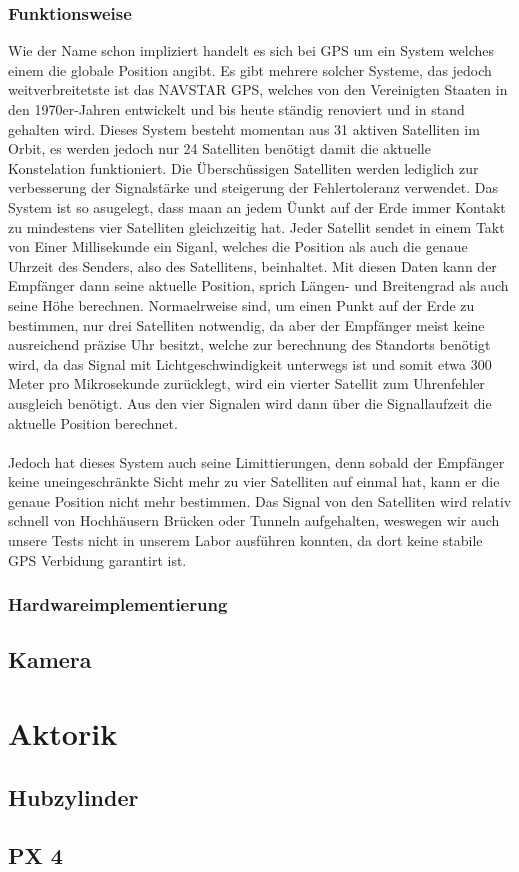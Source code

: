 \subsubsection{Funktionsweise}
Wie der Name schon impliziert handelt es sich bei GPS um ein System welches einem die globale Position angibt. Es gibt mehrere solcher Systeme, das jedoch weitverbreitetste ist das NAVSTAR GPS, welches von den Vereinigten Staaten in den 1970er-Jahren entwickelt und bis heute ständig renoviert und in stand gehalten wird. Dieses System besteht momentan aus 31 aktiven Satelliten im Orbit, es werden jedoch nur 24 Satelliten benötigt damit die aktuelle Konstelation funktioniert. Die Überschüssigen Satelliten werden lediglich zur verbesserung der Signalstärke und steigerung der Fehlertoleranz verwendet. Das System ist so asugelegt, dass maan an jedem Üunkt auf der Erde immer Kontakt zu mindestens vier Satelliten gleichzeitig hat. Jeder Satellit sendet in einem Takt von Einer Millisekunde ein Siganl, welches die Position als auch die genaue Uhrzeit des Senders, also des Satellitens, beinhaltet. Mit diesen Daten kann der Empfänger dann seine aktuelle Position, sprich Längen- und Breitengrad als auch seine Höhe berechnen. Normaelrweise sind, um einen Punkt auf der Erde zu bestimmen, nur drei Satelliten notwendig, da aber der Empfänger meist keine ausreichend präzise Uhr besitzt, welche zur berechnung des Standorts benötigt wird, da das Signal mit Lichtgeschwindigkeit unterwegs ist und somit etwa 300 Meter pro Mikrosekunde zurücklegt, wird ein vierter Satellit zum Uhrenfehler ausgleich benötigt. Aus den vier Signalen wird dann über die Signallaufzeit die aktuelle Position berechnet.
\\
\\
Jedoch hat dieses System auch seine Limittierungen, denn sobald der Empfänger keine uneingeschränkte Sicht mehr zu vier Satelliten auf einmal hat, kann er die genaue Position nicht mehr bestimmen. Das Signal von den Satelliten wird relativ schnell von Hochhäusern Brücken oder Tunneln aufgehalten, weswegen wir auch unsere Tests nicht in unserem Labor ausführen konnten, da dort keine stabile GPS Verbidung garantirt ist.

\subsubsection{Hardwareimplementierung}

\subsection{Kamera}

\section{Aktorik}

\subsection{Hubzylinder}

\subsection{PX 4}
